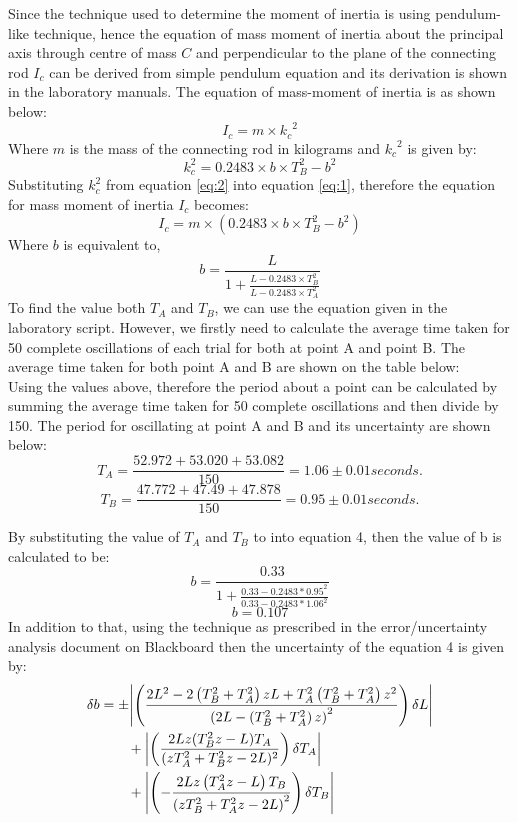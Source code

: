 Since the technique used to determine the moment of inertia is using pendulum-like technique, hence the equation of mass moment of inertia about the principal axis through centre of mass $C$ and perpendicular to the plane of the connecting rod $I_c$ can be derived from simple pendulum equation and its derivation is shown in the laboratory manuals. The equation of mass-moment of inertia is as shown below: 
\begin{equation}\label{eq:1}
 I_c = m \times {k_c}^2 
\end{equation}
Where $m$ is the mass of the connecting rod in kilograms and ${k_c}^2$ is given by:
\begin{equation}\label{eq:2}
k_c^2 = 0.2483 \times b \times T_B^2 - b^2
\end{equation}
Substituting $k_c^2$ from equation \ref{eq:2} into equation \ref{eq:1}, therefore the equation for mass moment of inertia $I_c$ becomes:
\begin{equation}
I_c = m \times (0.2483 \times b \times T_B^2 - b^2)
\end{equation}
Where $b$ is equivalent to, \begin{equation} b = \frac{L}{1 + \frac{L- 0.2483 \times T_B^2}{L - 0.2483 \times T_A^2}}\end{equation}
To find the value both $T_A$ and $T_B$, we can use the equation given in the laboratory script. However, we firstly need to calculate the average time taken for 50 complete oscillations of each trial for both at point A and point B. The average time taken for both point A and B are shown on the table below: \\

Using the values above, therefore the period about a point can be calculated by summing the average time taken for 50 complete oscillations and then divide by 150. The period for oscillating at point A and B and its uncertainty are shown below:
\[T_A= \frac{52.972 + 53.020 + 53.082}{150} = 1.06 \pm 0.01 seconds.\]
\[T_B= \frac{47.772 + 47.49 + 47.878}{150} =  0.95\pm 0.01 seconds.\]

By substituting the value of $T_A$ and $T_B$ to into equation 4, then the value of b is calculated to be:
\[b = \frac{0.33}{1 + \frac{0.33 - 0.2483 * 0.95^2}{0.33 - 0.2483 * 1.06^2}}\]
\[b = 0.107\]
In addition to that, using the technique as prescribed in the error/uncertainty analysis document on Blackboard then the uncertainty of the equation 4 is given by:
\begin{align}
\delta b &= \pm \abs{\left(\dfrac{2L^2-2\left(T_B^2+T_A^2\right)zL+T_A^2\left(T_B^2+T_A^2\right)z^2}{\left(2L-\left(T_B^2+T_A^2\right)z\right)^2}\right)\delta L} \notag \\
&\qquad + \abs{\left(\dfrac{2Lz(T_B^2z-L)T_A}{(zT_A^2+T_B^2z-2L)^2}\right)\delta T_A} \notag \\ 
&\qquad + \abs{\left(-\dfrac{2Lz\left(T_A^2z-L\right)T_B}{\left(zT_B^2+T_A^2z-2L\right)^2}\right)\delta T_B} \notag
\end{align}

